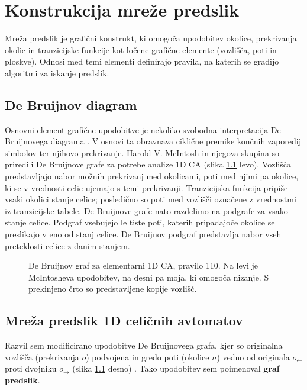 \documentclass[12pt,a4paper,openany,twoside]{book}
\begin{document}
\chapter{Konstrukcija mreže predslik}
\label{mreža}

Mreža predslik je grafični konstrukt, ki omogoča upodobitev
okolice, prekrivanja okolic in tranzicijske funkcije
kot ločene grafične elemente (vozlišča, poti in ploskve).
Odnosi med temi elementi definirajo pravila,
na katerih se gradijo algoritmi za iskanje predslik.

\section{De Bruijnov diagram}

Osnovni element grafične upodobitve je nekoliko svobodna interpretacija De Bruijnovega diagrama \cite{WikiDeBruijn}.
V osnovi ta obravnava ciklične premike končnih zaporedij simbolov ter njihovo prekrivanje.
Harold V. McIntosh \cite{McIntosh1991} in njegova skupina \cite{Soto2008}
so priredili De Bruijnove grafe za potrebe analize 1D CA (slika \ref{de_bruijn_diagram} levo).
Vozlišča predstavljajo nabor možnih prekrivanj med okolicami,
poti med njimi pa okolice, ki se v vrednosti celic ujemajo s temi prekrivanji.
Tranzicijska funkcija pripiše vsaki okolici stanje celice;
posledično so poti med vozlišči označene z vrednostmi iz tranzicijske tabele.
De Bruijnove grafe nato razdelimo na podgrafe za vsako stanje celice.
Podgraf vsebujejo le tiste poti, katerih pripadajoče okolice se preslikajo v eno od stanj celice.
De Bruijnov podgraf predstavlja nabor vseh preteklosti celice z danim stanjem.

\begin{figure}[htb]
\centerline{}
\caption[De Bruijnov graf, pravilo 110.]
{De Bruijnov graf za elementarni 1D CA, pravilo 110.
Na levi je McIntosheva upodobitev, na desni pa moja, ki omogoča nizanje.
S prekinjeno črto so predstavljene kopije vozlišč.}
\label{de_bruijn_diagram}
\end{figure}

\section{Mreža predslik 1D celičnih avtomatov}

Razvil sem modificirano upodobitve De Bruijnovega grafa,
kjer so originalna vozlišča (prekrivanja \(o\)) podvojena
in gredo poti (okolice \(n\)) vedno od originala \(o_{\leftarrow}\)
proti dvojniku \(o_{\rightarrow}\) (slika \ref{de_bruijn_diagram} desno) \cite{JerasDobnikar2007}.
Tako upodobitev sem poimenoval \textbf{graf predslik}.
\end{document}
